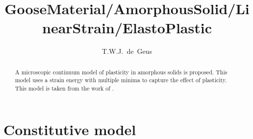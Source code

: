 \documentclass[times,namecite]{goose-article}
\title{%
  GooseMaterial/AmorphousSolid/LinearStrain/ElastoPlastic
}
\author{T.W.J.~de~Geus}
\begin{document}
\maketitle

\begin{abstract}
A microscopic continuum model of plasticity in amorphous solids is proposed. This model uses a strain energy with multiple minima to capture the effect of plasticity. This model is taken from the work of \citet{Jagla2017}.
\end{abstract}


\setcounter{tocdepth}{2}
\tableofcontents

\vfill\newpage
\section{Constitutive model}
\end{document}
